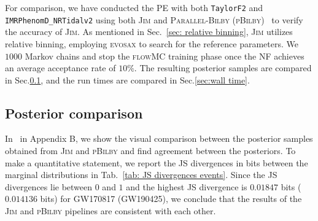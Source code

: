 \documentclass[prd,twocolumn,a4paper,floatfix,nofootinbib,preprintnumbers,superscriptaddress]{revtex4-1}
\begin{document}
For comparison, we have conducted the \ac{PE} with both \texttt{TaylorF2} and \texttt{IMRPhenomD\_NRTidalv2} using both \textsc{Jim} and \textsc{Parallel-Bilby} (\textsc{pBilby})~\cite{Smith:2019ucc} to verify the accuracy of \textsc{Jim}. As mentioned in Sec.~\ref{sec: relative binning}, \textsc{Jim} utilizes relative binning, employing \textsc{evosax} to search for the reference parameters. We ${1000}$ Markov chains and stop the \textsc{flowMC} training phase once the \ac{NF} achieves an average acceptance rate of $10\%$.  The resulting posterior samples are compared in Sec.\ref{sec:posterior_comparison}, and the run times are compared in Sec.\ref{sec:wall time}.

\subsection{Posterior comparison}
\label{sec:posterior_comparison}

In~ in Appendix B, we show the visual comparison between the posterior samples obtained from \textsc{Jim} and \textsc{pBilby} and find agreement between the posteriors. To make a quantitative statement, we report the \ac{JS} divergences \cite{lin1991divergence} in bits between the marginal distributions in Tab.~\ref{tab: JS divergences events}. Since the \ac{JS} divergences lie between $0$ and $1$ and the highest \ac{JS} divergence is $0.01847$ bits ($0.014136$ bits) for GW170817 (GW190425), we conclude that the results of the \textsc{Jim} and \textsc{pBilby} pipelines are consistent with each other. 
\end{document}
